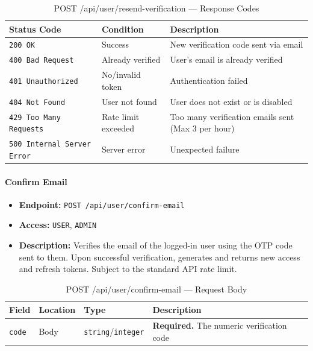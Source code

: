 \begin{table}[H]
\centering
\renewcommand{\arraystretch}{1.3}
\begin{tabularx}{\textwidth}{|l|l|X|}
\hline
\textbf{Status Code} & \textbf{Condition} & \textbf{Description} \\
\hline
\texttt{200 OK}           & Success              & New verification code sent via email \\
\hline
\texttt{400 Bad Request}  & Already verified     & User's email is already verified \\
\hline
\texttt{401 Unauthorized} & No/invalid token     & Authentication failed \\
\hline
\texttt{404 Not Found}    & User not found       & User does not exist or is disabled \\
\hline
\texttt{429 Too Many Requests} & Rate limit exceeded & Too many verification emails sent (Max 3 per hour) \\
\hline
\texttt{500 Internal Server Error} & Server error & Unexpected failure \\
\hline
\end{tabularx}
\caption{POST /api/user/resend-verification — Response Codes}
\label{tab:resend-verification-code-responses}
\end{table}
\FloatBarrier

\paragraph{Confirm Email}
\label{subsubsec:confirm-email}

\begin{itemize}
  \item \textbf{Endpoint:} \texttt{POST /api/user/confirm-email}
  \item \textbf{Access:} \texttt{USER}, \texttt{ADMIN}
  \item \textbf{Description:} Verifies the email of the logged-in user using the OTP code sent to them. Upon successful verification, generates and returns new access and refresh tokens. Subject to the standard API rate limit.
\end{itemize}

\begin{table}[H]
\centering
\renewcommand{\arraystretch}{1.3}
\begin{tabularx}{\textwidth}{|l|l|l|X|}
\hline
\textbf{Field} & \textbf{Location} & \textbf{Type} & \textbf{Description} \\
\hline
\texttt{code} & Body & \texttt{string}/\texttt{integer} & \textbf{Required.} The numeric verification code \\
\hline
\end{tabularx}
\caption{POST /api/user/confirm-email — Request Body}
\label{tab:confirm-email-body}
\end{table}


